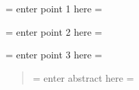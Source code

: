\documentclass[draft,linenumbers]{agujournal}
\begin{document}





\begin{keypoints}
\item = enter point 1 here = 
\item = enter point 2 here = 
\item = enter point 3 here = 
\end{keypoints}

%
%


\begin{abstract}
= enter abstract here =
\end{abstract}


%
%

% 
\end{document}
